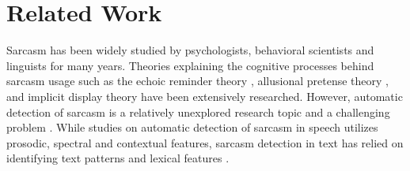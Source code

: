 \section{Related Work}
\label{sec:related}
Sarcasm has been widely studied by psychologists, behavioral scientists and linguists for many years. Theories explaining the cognitive processes behind sarcasm usage such as the echoic reminder theory \cite{kreuz89}, allusional pretense theory \cite{kumon95}, and implicit display theory \cite{utsumi77} have been extensively researched. However, automatic detection of sarcasm is a relatively unexplored research topic and a challenging problem \cite{Pang2008}. While studies on automatic detection of sarcasm in speech \cite{tepper06} utilizes prosodic, spectral and contextual features, sarcasm detection in text has relied on identifying text patterns \cite{davidov10} and lexical features \cite{Kreuz07}.\\

